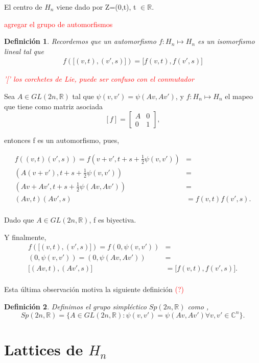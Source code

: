 \documentclass[12pt]{article}
\newtheorem{definition}{Definición}
\begin{document}
El centro de $H_{n}$ viene dado por Z=(0,t), t $\in \mathbb{R}.$

\textcolor{red}{agregar el grupo de automorfismos }
\begin{definition}
 Recordemos que un automorfismo $f: H_n \mapsto H_n$ es un isomorfismo lineal tal que 
 $$\begin{aligned}
    f({[}(v,t),(v',s){]})={[}f(v,t),f(v',s){]}
 \end{aligned}$$
 
 \textcolor{red}{ '[' los corchetes de Lie, puede ser confuso con el conmutador}
\end{definition}

Sea $A \in GL(2n,\mathbb{R})$ tal que  $\psi(v,v')=\psi(Av, Av')$, y  $f:H_n \mapsto H_n$ el mapeo
que tiene como matriz asociada 
$$[f] = 
\begin{bmatrix}
A & 0\\
0 & 1
\end{bmatrix},$$

entonces f es un automorfismo, pues,

$$\begin{aligned}
f((v,t) (v',s))=f(v+v',t+s+ \frac{1}{2} \psi(v,v'))&=\\
(A(v+v'),t+s+ \frac{1}{2} \psi(v,v'))&=\\
(Av+Av',t+s+ \frac{1}{2} \psi(Av,Av'))&=\\
(Av,t)(Av',s)&=f(v,t) f(v',s).\\
\end{aligned}$$

Dado que $A \in GL(2n,\mathbb{R})$, f es biyectiva.

Y finalmente,
$$\begin{aligned}
f({[}(v,t),(v',s){]})=f(0,\psi(v,v'))&=\\
(0,\psi(v,v'))=(0,\psi(Av,Av'))&=\\
{[}(Av,t),(Av',s){]}&={[}f(v,t),f(v',s){]}.\\
\end{aligned}$$

Esta última observación motiva la siguiente definición \textcolor{red}{(?)}
\begin{definition}
 Definimos el grupo simpléctico $Sp(2n,\mathbb{R})$ como ,
 $$
 Sp(2n,\mathbb{R})=\{ A \in GL(2n,\mathbb{R}): \psi(v,v')=\psi(Av,Av') \forall v,v' \in \mathbb{C}^n\}.
 $$
\end{definition}

\section{Lattices de $H_n$}
\end{document}
